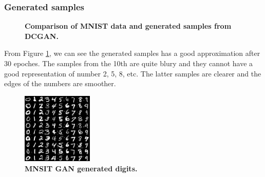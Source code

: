 \documentclass{article}
\newcommand{\mycaption}[2]{\caption[#1]{\textbf{#1.} #2}}
\begin{document}
\newpage
\subsubsection{Generated samples}

\begin{figure}[!htb]
  \centering
  \mycaption{Comparison of MNIST data and generated samples from DCGAN}{}
  \label{fig_DCGAN_MNIST}
\end{figure}

From Figure \ref{fig_DCGAN_MNIST}, 
we can see the generated samples has a good approximation after 30 epoches.
The samples from the 10th are quite blury and they cannot have a good representation of number 2, 5, 8, etc.
The latter samples are clearer and the edges of the numbers are smoother.

\begin{figure}[!htb]
  \centering
  \includegraphics[width=0.3\textwidth]{imgs/MNIST_digits.png}
  \mycaption{MNSIT GAN generated digits}{}
  \label{fig_MNSIT_digits}
\end{figure}
\end{document}

